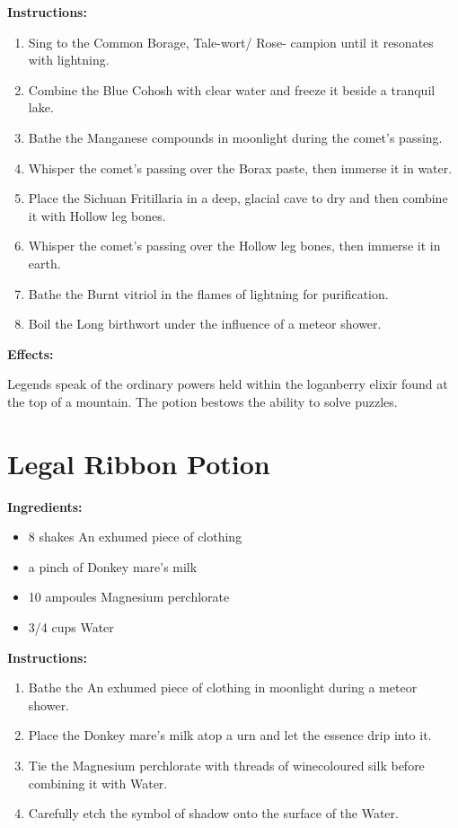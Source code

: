 \documentclass{article}
\begin{document}
\textbf{Instructions:}

\begin{enumerate}
  \item Sing to the Common Borage, Tale-wort/ Rose- campion until it resonates with lightning.
  \item Combine the Blue Cohosh with clear water and freeze it beside a tranquil lake.
  \item Bathe the Manganese compounds in moonlight during the comet’s passing.
  \item Whisper the comet’s passing over the Borax paste, then immerse it in water.
  \item Place the Sichuan Fritillaria in a deep, glacial cave to dry and then combine it with Hollow leg bones.
  \item Whisper the comet’s passing over the Hollow leg bones, then immerse it in earth.
  \item Bathe the Burnt vitriol in the flames of lightning for purification.
  \item Boil the Long birthwort under the influence of a meteor shower.
\end{enumerate}

\textbf{Effects:}

Legends speak of the ordinary powers held within the loganberry elixir found at the top of a mountain. The potion bestows the ability to solve puzzles.

\newpage
\section*{Legal Ribbon Potion}

\textbf{Ingredients:}

\begin{itemize}
  \item 8 shakes An exhumed piece of clothing
  \item a pinch of Donkey mare's milk
  \item 10 ampoules Magnesium perchlorate
  \item 3/4 cups Water
\end{itemize}

\textbf{Instructions:}

\begin{enumerate}
  \item Bathe the An exhumed piece of clothing in moonlight during a meteor shower.
  \item Place the Donkey mare's milk atop a urn and let the essence drip into it.
  \item Tie the Magnesium perchlorate with threads of winecoloured silk before combining it with Water.
  \item Carefully etch the symbol of shadow onto the surface of the Water.
\end{enumerate}
\end{document}
